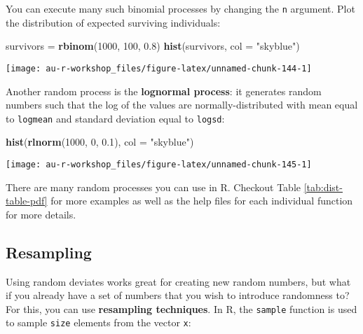 \documentclass[]{book}
\newenvironment{Shaded}{\begin{snugshade}}{\end{snugshade}}
\newcommand{\KeywordTok}[1]{\textcolor[rgb]{0.13,0.29,0.53}{\textbf{#1}}}
\newcommand{\DataTypeTok}[1]{\textcolor[rgb]{0.13,0.29,0.53}{#1}}
\newcommand{\DecValTok}[1]{\textcolor[rgb]{0.00,0.00,0.81}{#1}}
\newcommand{\FloatTok}[1]{\textcolor[rgb]{0.00,0.00,0.81}{#1}}
\newcommand{\StringTok}[1]{\textcolor[rgb]{0.31,0.60,0.02}{#1}}
\newcommand{\NormalTok}[1]{#1}
\theoremstyle{definition}
\theoremstyle{definition}
\theoremstyle{definition}
\theoremstyle{remark}
\begin{document}
You can execute many such binomial processes by changing the \texttt{n}
argument. Plot the distribution of expected surviving individuals:

\begin{Shaded}
\begin{Highlighting}[]
\NormalTok{survivors =}\StringTok{ }\KeywordTok{rbinom}\NormalTok{(}\DecValTok{1000}\NormalTok{, }\DecValTok{100}\NormalTok{, }\FloatTok{0.8}\NormalTok{)}
\KeywordTok{hist}\NormalTok{(survivors, }\DataTypeTok{col =} \StringTok{"skyblue"}\NormalTok{)}
\end{Highlighting}
\end{Shaded}

\begin{center}\texttt{[image: au-r-workshop\_files/figure-latex/unnamed-chunk-144-1]} \end{center}

Another random process is the \textbf{lognormal process}: it generates
random numbers such that the log of the values are normally-distributed
with mean equal to \texttt{logmean} and standard deviation equal to
\texttt{logsd}:

\begin{Shaded}
\begin{Highlighting}[]
\KeywordTok{hist}\NormalTok{(}\KeywordTok{rlnorm}\NormalTok{(}\DecValTok{1000}\NormalTok{, }\DecValTok{0}\NormalTok{, }\FloatTok{0.1}\NormalTok{), }\DataTypeTok{col =} \StringTok{"skyblue"}\NormalTok{)}
\end{Highlighting}
\end{Shaded}

\begin{center}\texttt{[image: au-r-workshop\_files/figure-latex/unnamed-chunk-145-1]} \end{center}

There are many random processes you can use in R. Checkout Table
\ref{tab:dist-table-pdf} for more examples as well as the help files for
each individual function for more details.

\subsection{Resampling}\label{resampling}

Using random deviates works great for creating new random numbers, but
what if you already have a set of numbers that you wish to introduce
randomness to? For this, you can use \textbf{resampling techniques}. In
R, the \texttt{sample} function is used to sample \texttt{size} elements
from the vector \texttt{x}:
\end{document}
